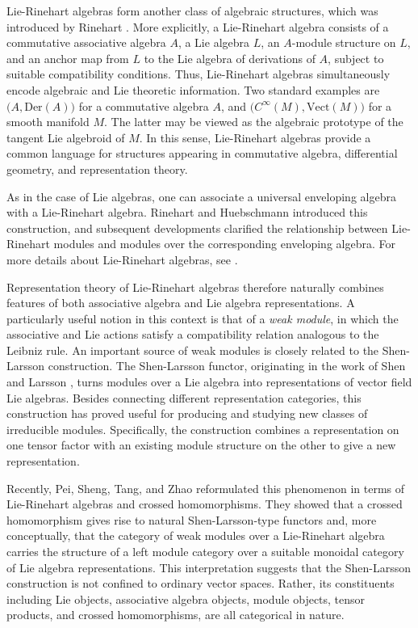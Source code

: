 \documentclass[11pt]{amsart}
\theoremstyle{definition}
\numberwithin{equation}{section}
\begin{document}
Lie-Rinehart algebras form another class of algebraic structures, which was introduced by Rinehart \cite{Rin63}. More explicitly, a Lie-Rinehart algebra consists of a commutative associative algebra $A$, a Lie algebra $L$, an $A$-module structure on $L$, and an anchor map from $L$ to the Lie algebra of derivations of $A$, subject to suitable compatibility conditions. 
Thus, Lie-Rinehart algebras simultaneously encode algebraic and Lie theoretic information. 
Two standard examples are $\big(A,\mathrm{Der}(A)\big)$
for a commutative algebra $A$, and $\big(C^{\infty}(M),\mathrm{Vect}(M)\big)$
for a smooth manifold $M$. 
The latter may be viewed as the algebraic prototype of the tangent Lie algebroid of $M$. 
In this sense, Lie-Rinehart algebras provide a common language for structures appearing in commutative algebra, differential geometry, and representation theory.

As in the case of Lie algebras, one can associate a universal enveloping algebra with a Lie-Rinehart algebra. 
Rinehart \cite{Rin63} and Huebschmann \cite{Hue90} introduced this construction, and subsequent developments clarified the relationship between Lie-Rinehart modules and modules over the corresponding enveloping algebra. For more details about  Lie-Rinehart algebras, see \cite{Hue04,Hue21,BKS24,CLP04,Sar22,BEMS}. 

Representation theory of Lie-Rinehart algebras therefore naturally combines features of both associative algebra and Lie algebra representations. 
A particularly useful notion in this context is that of a \emph{weak module}, in which the associative and Lie actions satisfy a compatibility relation analogous to the Leibniz rule.
An important source of weak modules is closely related to the Shen-Larsson construction. 
The Shen-Larsson functor, originating in the work of Shen \cite{She86} and Larsson \cite{Lar92}, {turns modules over a Lie algebra into representations of vector field Lie algebras}.
Besides connecting different representation categories, this construction has proved useful for producing and studying new classes of irreducible modules. 
{Specifically, the construction combines a representation on one tensor factor with an existing module structure on the other to give a new representation}.

Recently, Pei, Sheng, Tang, and Zhao \cite{PSTZ23} reformulated this phenomenon in terms of Lie-Rinehart algebras and crossed homomorphisms. 
They showed that a crossed homomorphism gives rise to natural Shen-Larsson-type functors and, more conceptually, that the category of weak modules over a Lie-Rinehart algebra carries the structure of a left module category over a suitable monoidal category of Lie algebra representations. 
This interpretation suggests that the Shen-Larsson construction is not confined to ordinary vector spaces. Rather, its constituents including Lie objects, associative algebra objects, module objects, tensor products, and crossed homomorphisms, are all categorical in nature.
\end{document}
